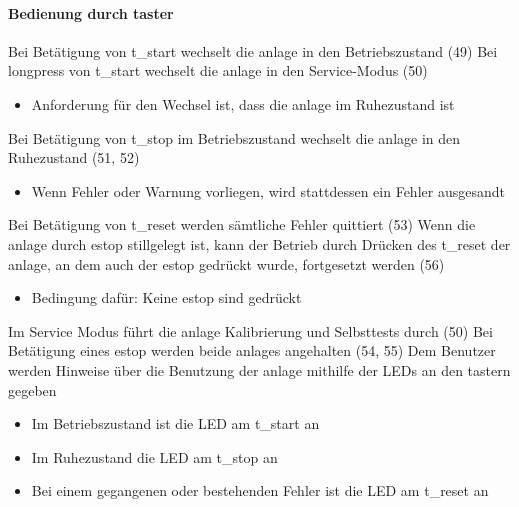 \paragraph{Bedienung durch \gls{taster}}
\begin{itemize}
     Bei Betätigung von \gls{t_start} wechselt die \gls{anlage} in den Betriebszustand (49)
     Bei \gls{longpress} von \gls{t_start} wechselt die \gls{anlage} in den Service-Modus (50)
    \begin{itemize}
        \item Anforderung für den Wechsel ist, dass die \gls{anlage} im Ruhezustand ist
    \end{itemize}
     Bei Betätigung von \gls{t_stop} im Betriebszustand wechselt die \gls{anlage} in den Ruhezustand (51, 52)
    \begin{itemize}
        \item Wenn Fehler oder Warnung vorliegen, wird stattdessen ein Fehler ausgesandt  %
    \end{itemize}
     Bei Betätigung von \gls{t_reset} werden sämtliche Fehler quittiert (53) %
     Wenn die \gls{anlage} durch \gls{estop} stillgelegt ist, kann der Betrieb durch Drücken des
    \gls{t_reset} der \gls{anlage}, an dem auch der \gls{estop} gedrückt wurde, fortgesetzt werden (56) %
    \begin{itemize}
        \item Bedingung dafür: Keine \gls{estop} sind gedrückt
    \end{itemize}
     Im Service Modus führt die \gls{anlage} Kalibrierung und Selbsttests durch (50) %
     Bei Betätigung eines \gls{estop} werden beide \glspl{anlage} angehalten (54, 55)
     Dem Benutzer werden Hinweise über die Benutzung der \gls{anlage} mithilfe der LEDs an den \gls{taster}n gegeben
    \begin{itemize}
        \item Im Betriebszustand ist die LED am \gls{t_start} an
        \item Im Ruhezustand die LED am \gls{t_stop} an
        \item Bei einem gegangenen oder bestehenden Fehler ist die LED am \gls{t_reset} an
    \end{itemize}
\end{itemize}


